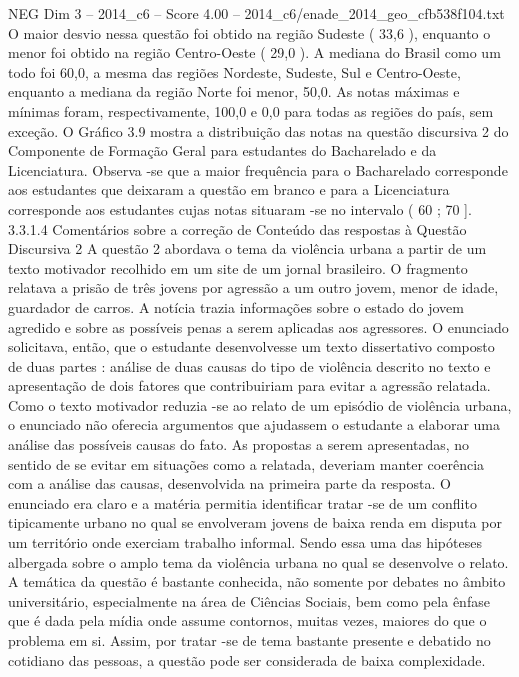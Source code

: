\begin{textsample}{NEG Dim 3 – 2014\_c6 – Score 4.00 – 2014\_c6/enade\_2014\_geo\_cfb538f104.txt}
O maior desvio nessa questão foi obtido na região Sudeste ( 33,6 ), enquanto o menor foi obtido na região Centro-Oeste ( 29,0 ).
A mediana do Brasil como um todo foi 60,0, a mesma das regiões Nordeste, Sudeste, Sul e Centro-Oeste, enquanto a mediana da região Norte foi menor, 50,0.
As notas máximas e mínimas foram, respectivamente, 100,0 e 0,0 para todas as regiões do país, sem exceção.
O Gráfico 3.9 mostra a distribuição das notas na questão discursiva 2 do Componente de Formação Geral para estudantes do Bacharelado e da Licenciatura.
Observa -se que a maior frequência para o Bacharelado corresponde aos estudantes que deixaram a questão em branco e para a Licenciatura corresponde aos estudantes cujas notas situaram -se no intervalo ( 60 ; 70 ]. 3.3.1.4 Comentários sobre a correção de Conteúdo das respostas à Questão Discursiva 2 A questão 2 abordava o tema da violência urbana a partir de um texto motivador recolhido em um site de um jornal brasileiro.
O fragmento relatava a prisão de três jovens por agressão a um outro jovem, menor de idade, guardador de carros.
A notícia trazia informações sobre o estado do jovem agredido e sobre as possíveis penas a serem aplicadas aos agressores.
O enunciado solicitava, então, que o estudante desenvolvesse um texto dissertativo composto de duas partes : análise de duas causas do tipo de violência descrito no texto e apresentação de dois fatores que contribuiriam para evitar a agressão relatada.
Como o texto motivador reduzia -se ao relato de um episódio de violência urbana, o enunciado não oferecia argumentos que ajudassem o estudante a elaborar uma análise das possíveis causas do fato.
As propostas a serem apresentadas, no sentido de se evitar em situações como a relatada, deveriam manter coerência com a análise das causas, desenvolvida na primeira parte da resposta.
O enunciado era claro e a matéria permitia identificar tratar -se de um conflito tipicamente urbano no qual se envolveram jovens de baixa renda em disputa por um território onde exerciam trabalho informal.
Sendo essa uma das hipóteses albergada sobre o amplo tema da violência urbana no qual se desenvolve o relato.
A temática da questão é bastante conhecida, não somente por debates no âmbito universitário, especialmente na área de Ciências Sociais, bem como pela ênfase que é dada pela mídia onde assume contornos, muitas vezes, maiores do que o problema em si.
Assim, por tratar -se de tema bastante presente e debatido no cotidiano das pessoas, a questão pode ser considerada de baixa complexidade.

\end{textsample}

